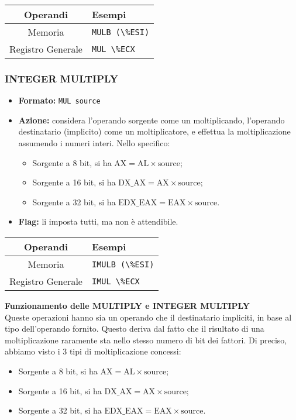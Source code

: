 \documentclass[a4paper,11pt]{article}
\begin{document}
		\begin{table}[H]
		\center {}
			\begin{tabular} { c | p{5cm} }
				\bfseries Operandi & \bfseries Esempi \\
				\hline
				Memoria & \lstinline|MULB (\%ESI)| \\ 
				Registro Generale & \lstinline|MUL \%ECX|
			\end{tabular}
		\end{table}

\subsubsection{INTEGER MULTIPLY}
\begin{itemize}
	\item \textbf{Formato:} \lstinline|MUL source|
	\item \textbf{Azione:} considera l'operando sorgente come un moltiplicando, l'operando destinatario (implicito) come un moltiplicatore, e effettua la moltiplicazione assumendo i numeri interi. Nello specifico:
	\begin{itemize}
		\item Sorgente a 8 bit, si ha $\text{AX} = \text{AL} \times \text{source}$;
		\item Sorgente a 16 bit, si ha $\text{DX}\_\text{AX} = \text{AX} \times \text{source}$;
		\item Sorgente a 32 bit, si ha $\text{EDX}\_\text{EAX} = \text{EAX} \times \text{source}$.
	\end{itemize}
	\item \textbf{Flag:} li imposta tutti, ma non è attendibile.
\end{itemize}

		\begin{table}[H]
		\center {}
			\begin{tabular} { c | p{5cm} }
				\bfseries Operandi & \bfseries Esempi \\
				\hline
				Memoria & \lstinline|IMULB (\%ESI)| \\ 
				Registro Generale & \lstinline|IMUL \%ECX|
			\end{tabular}
		\end{table}

\par\medskip
\noindent
\textbf{\textsf{Funzionamento delle MULTIPLY e INTEGER MULTIPLY}} \\
Queste operazioni hanno sia un operando che il destinatario impliciti, in base al tipo dell'operando fornito.
Questo deriva dal fatto che il risultato di una moltiplicazione raramente sta nello stesso numero di bit dei fattori.
Di preciso, abbiamo visto i 3 tipi di moltiplicazione concessi:
\begin{itemize}
	\item Sorgente a 8 bit, si ha $\text{AX} = \text{AL} \times \text{source}$;
	\item Sorgente a 16 bit, si ha $\text{DX}\_\text{AX} = \text{AX} \times \text{source}$;
	\item Sorgente a 32 bit, si ha $\text{EDX}\_\text{EAX} = \text{EAX} \times \text{source}$.
\end{itemize}
\end{document}
